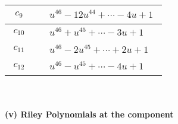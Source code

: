 \documentclass[1p]{elsarticle_modified}
\theoremstyle{definition}
\begin{document}
\begin{tabular}{m{50pt}|m{274pt}}
\hline $$\begin{aligned}c_{9}\end{aligned}$$&$\begin{aligned}
&u^{46}-12 u^{44}+\cdots-4 u+1
\end{aligned}$\\
\hline $$\begin{aligned}c_{10}\end{aligned}$$&$\begin{aligned}
&u^{46}+u^{45}+\cdots-3 u+1
\end{aligned}$\\
\hline $$\begin{aligned}c_{11}\end{aligned}$$&$\begin{aligned}
&u^{46}-2 u^{45}+\cdots+2 u+1
\end{aligned}$\\
\hline $$\begin{aligned}c_{12}\end{aligned}$$&$\begin{aligned}
&u^{46}- u^{45}+\cdots-4 u+1
\end{aligned}$\\
\hline
\end{tabular}\\~\\
\newpage\renewcommand{\arraystretch}{1}
\flushleft \textbf{(v) Riley Polynomials at the component}\newline \\
\end{document}
